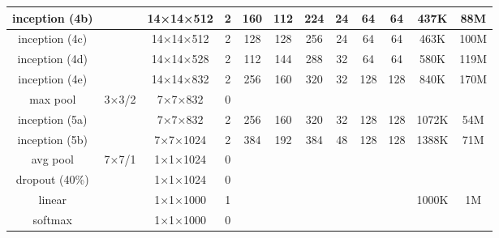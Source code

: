 \documentclass[a4paper]{article}
\begin{document}
\begin{table}[ht]
{\begin{tabular}{c|ccc|c|c|c|c|c|c|cc}
inception (4b) &                             & 14×14×512            & 2              & 160                   & 112                   & 224   & 24                    & 64                    & 64                 & 437K            & 88M          \\ \hline
inception (4c) &                             & 14×14×512            & 2              & 128                   & 128                   & 256   & 24                    & 64                    & 64                 & 463K            & 100M         \\ \hline
inception (4d) &                             & 14×14×528            & 2              & 112                   & 144                   & 288   & 32                    & 64                    & 64                 & 580K            & 119M         \\ \hline
inception (4e) &                             & 14×14×832            & 2              & 256                   & 160                   & 320   & 32                    & 128                   & 128                & 840K            & 170M         \\ \hline
max pool       & 3×3/2                       & 7×7×832              & 0              &                       &                       &       &                       &                       &                    &                 &              \\ \hline
inception (5a) &                             & 7×7×832              & 2              & 256                   & 160                   & 320   & 32                    & 128                   & 128                & 1072K           & 54M          \\ \hline
inception (5b) &                             & 7×7×1024             & 2              & 384                   & 192                   & 384   & 48                    & 128                   & 128                & 1388K           & 71M          \\ \hline
avg pool       & 7×7/1                       & 1×1×1024             & 0              &                       &                       &       &                       &                       &                    &                 &              \\ \hline
dropout (40\%) &                             & 1×1×1024             & 0              &                       &                       &       &                       &                       &                    &                 &              \\ \hline
linear         &                             & 1×1×1000             & 1              & \multicolumn{1}{l|}{} & \multicolumn{1}{l|}{} &       &                       &                       &                    & 1000K           & 1M           \\ \hline
softmax        &                             & 1×1×1000             & 0              &                       &                       &       &                       &                       &                    &                 &              \\ \hline
\end{tabular}

}
\end{table}
\end{document}
